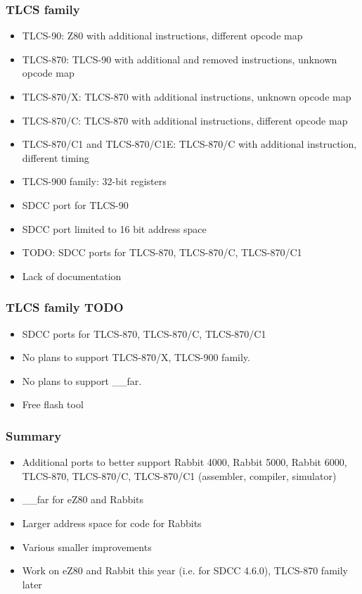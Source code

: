 \documentclass[xcolor=dvipsnames]{beamer}
\begin{document}
\begin{frame}
	\frametitle{TLCS family}
	\begin{itemize}
		\item TLCS-90: Z80 with additional instructions, different opcode map
		\item TLCS-870: TLCS-90 with additional and removed instructions, unknown opcode map
		\item TLCS-870/X: TLCS-870 with additional instructions, unknown opcode map
		\item TLCS-870/C: TLCS-870 with additional instructions, different opcode map
		\item TLCS-870/C1 and TLCS-870/C1E: TLCS-870/C with additional instruction, different timing
		\item TLCS-900 family: 32-bit registers
		\item SDCC port for TLCS-90
		\item SDCC port limited to 16 bit address space
		\item TODO: SDCC ports for TLCS-870, TLCS-870/C, TLCS-870/C1
		\item Lack of documentation
	\end{itemize}
\end{frame}

\begin{frame}
	\frametitle{TLCS family TODO}
	\begin{itemize}
		\item SDCC ports for TLCS-870, TLCS-870/C, TLCS-870/C1
		\item No plans to support TLCS-870/X, TLCS-900 family.
		\item No plans to support \_\_far.
		\item Free flash tool
	\end{itemize}
\end{frame}

\begin{frame}
	\frametitle{Summary}
	\begin{itemize}
		\item Additional ports to better support Rabbit 4000, Rabbit 5000, Rabbit 6000, TLCS-870, TLCS-870/C, TLCS-870/C1 (assembler, compiler, simulator)
		\item \_\_far for eZ80 and Rabbits
		\item Larger address space for code for Rabbits
		\item Various smaller improvements
		\item Work on eZ80 and Rabbit this year (i.e. for SDCC 4.6.0), TLCS-870 family later
	\end{itemize}
\end{frame}
\end{document}
